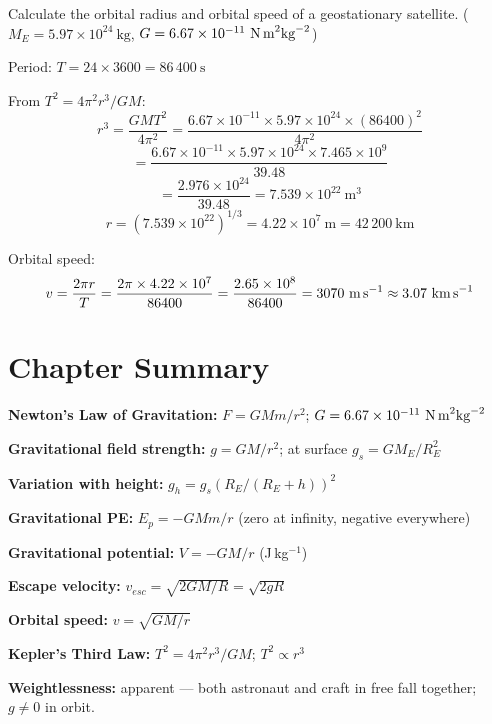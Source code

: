 \begin{examplebox}[8.5]
Calculate the orbital radius and orbital speed of a
geostationary satellite.
($M_E = 5.97\times10^{24}\ \text{kg}$,
$G = 6.67\times10^{-11}\ \text{N\,m}^2\text{kg}^{-2}$)
\end{examplebox}
 
\begin{solutionbox}
Period: $T = 24 \times 3600 = 86\,400\ \text{s}$
 
From $T^2 = 4\pi^2 r^3 / GM$:
\[
  r^3 = \frac{GM T^2}{4\pi^2}
  = \frac{6.67\times10^{-11}
    \times 5.97\times10^{24}
    \times (86400)^2}
    {4\pi^2}
\]
\[
  = \frac{6.67\times10^{-11}
    \times 5.97\times10^{24}
    \times 7.465\times10^9}
    {39.48}
\]
\[
  = \frac{2.976\times10^{24}}{39.48}
  = 7.539\times10^{22}\ \text{m}^3
\]
\[
  r = (7.539\times10^{22})^{1/3}
  = 4.22\times10^7\ \text{m}
  = 42\,200\ \text{km}
\]
 
Orbital speed:
\[
  v = \frac{2\pi r}{T}
  = \frac{2\pi \times 4.22\times10^7}{86400}
  = \frac{2.65\times10^8}{86400}
  = 3070\ \text{m\,s}^{-1}
  \approx 3.07\ \text{km\,s}^{-1}
\]
\end{solutionbox}

\section{Chapter Summary}

\begin{summarybox}
\textbf{Newton's Law of Gravitation:}
$F = GMm/r^2$; $G = 6.67\times10^{-11}\ \text{N\,m}^2\text{kg}^{-2}$

\textbf{Gravitational field strength:}
$g = GM/r^2$; at surface $g_s = GM_E/R_E^2$

\textbf{Variation with height:}
$g_h = g_s(R_E/(R_E+h))^2$

\textbf{Gravitational PE:}
$E_p = -GMm/r$ (zero at infinity, negative everywhere)

\textbf{Gravitational potential:}
$V = -GM/r$ (J\,kg$^{-1}$)

\textbf{Escape velocity:}
$v_{esc} = \sqrt{2GM/R} = \sqrt{2gR}$

\textbf{Orbital speed:}
$v = \sqrt{GM/r}$

\textbf{Kepler's Third Law:}
$T^2 = 4\pi^2 r^3/GM$; $T^2 \propto r^3$

\textbf{Weightlessness:} apparent --- both astronaut
and craft in free fall together; $g \neq 0$ in orbit.
\end{summarybox}

